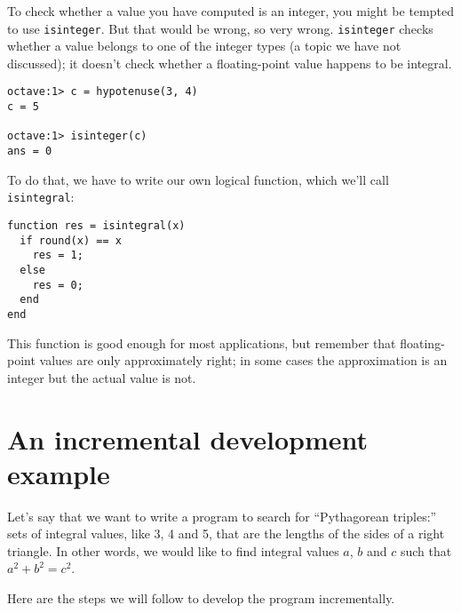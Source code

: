 To check whether a value you have computed is an integer, you might
be tempted to use {\tt isinteger}. But that would be wrong, so very
wrong. {\tt isinteger} checks whether a value belongs to one of
the integer types (a topic we have not discussed); it doesn't check
whether a floating-point value happens to be integral.

\begin{verbatim}
octave:1> c = hypotenuse(3, 4)
c = 5

octave:1> isinteger(c)
ans = 0
\end{verbatim}

To do that, we have to write our own logical function, which
we'll call {\tt isintegral}:

\begin{verbatim}
function res = isintegral(x)
  if round(x) == x
    res = 1;
  else
    res = 0;
  end
end
\end{verbatim}

This function is good enough for most applications, but remember
that floating-point values are only approximately right; in some
cases the approximation is an integer but the actual
value is not.


\section{An incremental development example}
\label{increxample}

Let's say that we want to write a program to search for ``Pythagorean
triples:'' sets of integral values, like 3, 4 and 5,
that are the lengths of the sides of a right triangle. In other
words, we would like to find integral values $a$, $b$ and $c$ such
that $a^2 + b^2 = c^2$.

Here are the steps we will follow to develop the program incrementally.

